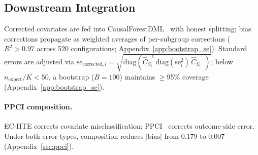 \subsection{Downstream Integration}

Corrected covariates are fed into CausalForestDML~\cite{wager2018causal} with honest splitting; bias corrections propagate as weighted averages of per-subgroup corrections ($R^2 > 0.97$ across 520 configurations; Appendix~\ref{app:bootstrap_se}).
Standard errors are adjusted via $\text{se}_{\text{corrected},i} = \sqrt{\text{diag}(\hat{C}_{S_i}^{-1}\, \text{diag}(\text{se}_i^2)\, \hat{C}_{S_i}^{-\top})}$; below $n_{\text{expert}}/K < 50$, a bootstrap ($B{=}100$) maintains $\geq$95\% coverage (Appendix~\ref{app:bootstrap_se}).

\paragraph{PPCI composition.}
EC-HTE corrects covariate misclassification; PPCI~\cite{sui2026ppci} corrects outcome-side error. Under both error types, composition reduces $|\text{bias}|$ from 0.179 to 0.007 (Appendix~\ref{sec:ppci}).
